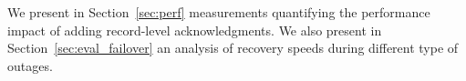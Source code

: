 We present in Section~\ref{sec:perf} measurements quantifying the
performance impact of adding \tcpls record-level acknowledgments. We also
present in Section~\ref{sec:eval_failover} an analysis of recovery speeds during
different type of outages.

